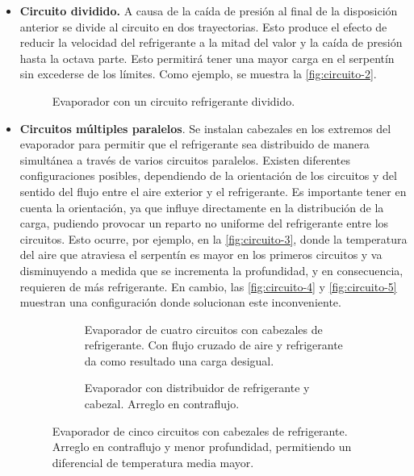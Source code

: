 \begin{itemize}
				\item \textbf{Circuito dividido.} A causa de la caída de presión al final de la disposición anterior se divide al circuito en dos trayectorias. Esto produce el efecto de reducir la velocidad del refrigerante a la mitad del valor y la caída de presión hasta la octava parte. Esto permitirá tener una mayor carga en el serpentín sin excederse de los límites. Como ejemplo, se muestra la \autoref{fig:circuito-2}.
				\begin{figure}[h]
					\centering
					\caption{Evaporador con un circuito refrigerante dividido.}
					\label{fig:circuito-2}
				\end{figure}
				\item \textbf{Circuitos múltiples paralelos}. Se instalan cabezales en los extremos del evaporador para permitir que el refrigerante sea distribuido de manera simultánea a través de varios circuitos paralelos. Existen diferentes configuraciones posibles, dependiendo de la orientación de los circuitos y del sentido del flujo entre el aire exterior y el refrigerante. Es importante tener en cuenta la orientación, ya que influye directamente en la distribución de la carga, pudiendo provocar un reparto no uniforme del refrigerante entre los circuitos. Esto ocurre, por ejemplo, en la \autoref{fig:circuito-3}, donde la temperatura del aire que atraviesa el serpentín es mayor en los primeros circuitos y va disminuyendo a medida que se incrementa la profundidad, y en consecuencia, requieren de más refrigerante. En cambio, las \autoref{fig:circuito-4} y \autoref{fig:circuito-5} muestran una configuración donde solucionan este inconveniente.
				\begin{figure}[h]
					\centering
					\begin{subfigure}{.3\linewidth}
						\caption{Evaporador de cuatro circuitos con cabezales de refrigerante. Con flujo cruzado de aire y refrigerante da como resultado una carga desigual.}
						\label{fig:circuito-3}
					\end{subfigure}
					\begin{subfigure}{.3\linewidth}
						\caption{Evaporador con distribuidor de refrigerante y cabezal. Arreglo en contraflujo.}
						\label{fig:circuito-4}
					\end{subfigure}
					\begin{subfigure}{.3\linewidth}
					\end{subfigure}
					\caption{Evaporador de cinco circuitos con cabezales de refrigerante. Arreglo en contraflujo y menor profundidad, permitiendo un diferencial de temperatura media mayor.}
					\label{fig:circuito-5}
				\end{figure}
			\end{itemize}
			
